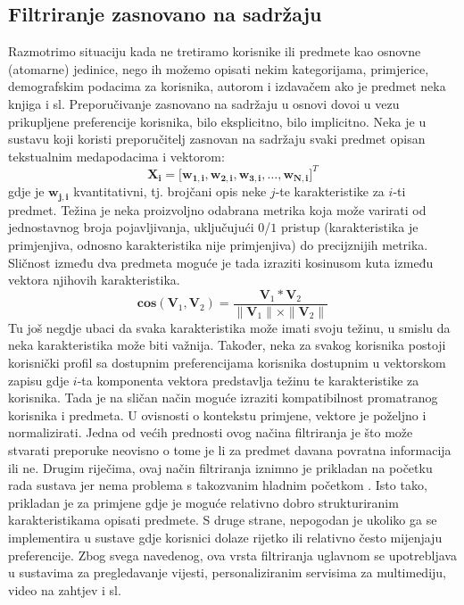 \documentclass[times, utf8, diplomski, numeric]{fer}
\begin{document}
\subsection{Filtriranje zasnovano na sadržaju}
Razmotrimo situaciju kada ne tretiramo korisnike ili predmete kao osnovne
(atomarne) jedinice, nego ih možemo opisati nekim kategorijama, primjerice,
demografskim podacima za korisnika, autorom i izdavačem ako je predmet neka
knjiga i sl. Preporučivanje zasnovano na sadržaju u osnovi dovoi u vezu
prikupljene preferencije korisnika, bilo eksplicitno, bilo implicitno. Neka je u
sustavu koji koristi preporučitelj zasnovan na sadržaju svaki predmet opisan
tekstualnim medapodacima i vektorom:
\begin{equation}
\label{eq:vektorKarakteristika}
	\boldsymbol{X_i} = 
		\big[ 
			\boldsymbol{w_{1,i}}, 
			\boldsymbol{w_{2,i}}, 
			\boldsymbol{w_{3,i}}, 
			\ldots, 
			\boldsymbol{w_{N,i}} 
		\big]^T
\end{equation}
gdje je $\boldsymbol{w_{j,i}}$ kvantitativni, tj. brojčani opis neke $j$-te
karakteristike za $i$-ti predmet. Težina je neka proizvoljno odabrana metrika
koja može varirati od jednostavnog broja pojavljivanja, uključujući $0$/$1$
pristup (karakteristika je primjenjiva, odnosno karakteristika nije
primjenjiva) do precijznijih metrika. Sličnost između dva predmeta moguće je
tada izraziti kosinusom kuta između vektora njihovih karakteristika. 
\begin{equation}
\label{eq:kosinus}
	\boldsymbol{cos}(\boldsymbol{V}_1, \boldsymbol{V}_2) = 
		\frac
			{\boldsymbol{V}_1 \ast \boldsymbol{V}_2}
			{\|\boldsymbol{V}_1\| \times \|\boldsymbol{V}_2\|}
\end{equation}
Tu još negdje ubaci da svaka karakteristika može imati svoju težinu, u smislu da
neka karakteristika može biti važnija.
Također, neka za svakog korisnika postoji korisnički profil sa dostupnim
preferencijama korisnika dostupnim u vektorskom zapisu gdje $i$-ta komponenta
vektora predstavlja težinu te karakteristike za korisnika. Tada je na sličan
način moguće izraziti kompatibilnost promatranog korisnika i predmeta. U
ovisnosti o kontekstu primjene, vektore je poželjno i normalizirati.
Jedna od većih prednosti ovog načina filtriranja je što može stvarati preporuke
neovisno o tome je li za predmet davana povratna informacija ili ne. Drugim
riječima, ovaj način filtriranja iznimno je prikladan na početku rada sustava
jer nema problema s takozvanim hladnim početkom . Isto
tako, prikladan je za primjene gdje je moguće relativno dobro strukturiranim
karakteristikama opisati predmete. S druge strane, nepogodan je ukoliko ga
se implementira u sustave gdje korisnici dolaze rijetko ili relativno često
mijenjaju preferencije. Zbog svega navedenog, ova vrsta filtriranja uglavnom se
upotrebljava u sustavima za pregledavanje vijesti, personaliziranim servisima za
multimediju, video na zahtjev i sl.
\end{document}
